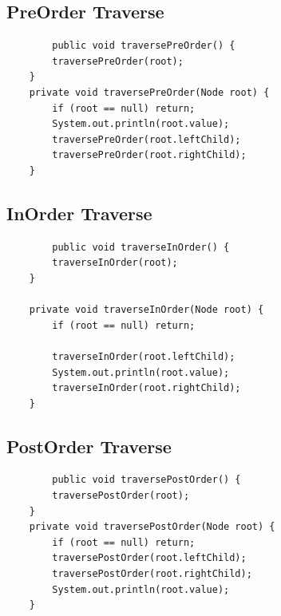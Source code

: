 \documentclass[
	11pt,
	fleqn,
	a4paper,
]{LegrandOrangeBook}
\begin{document}
\subsection{PreOrder Traverse}
\begin{verbatim}
        public void traversePreOrder() {
        traversePreOrder(root);
    }
    private void traversePreOrder(Node root) {
        if (root == null) return;
        System.out.println(root.value);
        traversePreOrder(root.leftChild);
        traversePreOrder(root.rightChild);
    }
\end{verbatim}
\subsection{InOrder Traverse}
\begin{verbatim}
        public void traverseInOrder() {
        traverseInOrder(root);
    }

    private void traverseInOrder(Node root) {
        if (root == null) return;

        traverseInOrder(root.leftChild);
        System.out.println(root.value);
        traverseInOrder(root.rightChild);
    }
\end{verbatim}
\subsection{PostOrder Traverse}
\begin{verbatim}
        public void traversePostOrder() {
        traversePostOrder(root);
    }
    private void traversePostOrder(Node root) {
        if (root == null) return;
        traversePostOrder(root.leftChild);
        traversePostOrder(root.rightChild);
        System.out.println(root.value);
    }
\end{verbatim}
\end{document}
